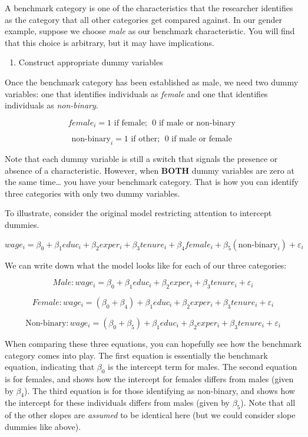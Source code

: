\documentclass[
]{book}
\providecommand{\tightlist}{%
  \setlength{\itemsep}{0pt}\setlength{\parskip}{0pt}}
\begin{document}
A benchmark category is one of the characteristics that the researcher identifies as the category that all other categories get compared against. In our gender example, suppose we choose \emph{male} as our benchmark characteristic. You will find that this choice is arbitrary, but it may have implications.

\begin{enumerate}
\def\labelenumi{\arabic{enumi}.}
\setcounter{enumi}{1}
\tightlist
\item
  Construct appropriate dummy variables
\end{enumerate}

Once the benchmark category has been established as male, we need two dummy variables: one that identifies individuals as \emph{female} and one that identifies individuals as \emph{non-binary}.

\[female_i = 1 \mbox{ if female; }\; 0 \mbox{ if male or non-binary }\]

\[\mbox{non-binary}_i = 1 \mbox{ if other; }\;  0 \mbox{ if male or female }\]

Note that each dummy variable is still a switch that signals the presence or absence of a characteristic. However, when \textbf{BOTH} dummy variables are zero at the same time\ldots{} you have your benchmark category. That is how you can identify three categories with only two dummy variables.

To illustrate, consider the original model restricting attention to intercept dummies.

\[wage_i=\beta_0+\beta_1educ_i+\beta_2exper_i+\beta_3tenure_i+\beta_4female_i +\beta_5(\mbox{non-binary}_i) +\varepsilon_i\]

We can write down what the model looks like for each of our three categories:

\[Male: wage_i=\beta_0+\beta_1educ_i+\beta_2exper_i+\beta_3tenure_i+\varepsilon_i\]

\[Female: wage_i=(\beta_0+\beta_4)+\beta_1educ_i+\beta_2exper_i+\beta_3tenure_i+\varepsilon_i\]

\[\mbox{Non-binary}: wage_i=(\beta_0+\beta_5)+\beta_1educ_i+\beta_2exper_i+\beta_3tenure_i+\varepsilon_i\]

When comparing these three equations, you can hopefully see how the benchmark category comes into play. The first equation is essentially the benchmark equation, indicating that \(\beta_0\) is the intercept term for males. The second equation is for females, and shows how the intercept for females differs from males (given by \(\beta_4\)). The third equation is for those identifying as non-binary, and shows how the intercept for these individuals differs from males (given by \(\beta_5\)). Note that all of the other slopes are \emph{assumed} to be identical here (but we could consider slope dummies like above).
\end{document}
